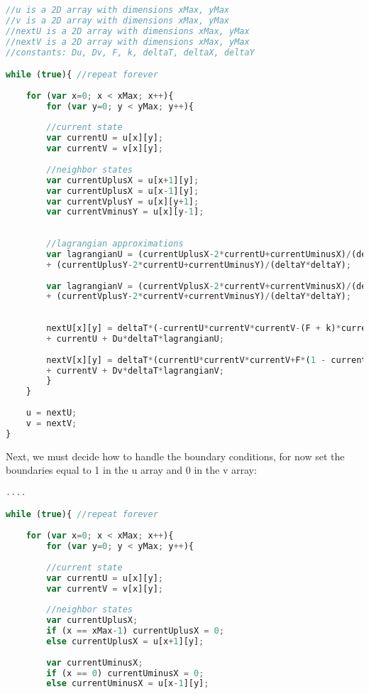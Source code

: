 {\begin{lstlisting}[language=JavaScript]
//u is a 2D array with dimensions xMax, yMax
//v is a 2D array with dimensions xMax, yMax
//nextU is a 2D array with dimensions xMax, yMax
//nextV is a 2D array with dimensions xMax, yMax
//constants: Du, Dv, F, k, deltaT, deltaX, deltaY

while (true){ //repeat forever
	
    for (var x=0; x < xMax; x++){
    	for (var y=0; y < yMax; y++){
    	
	    //current state
	    var currentU = u[x][y];
	    var currentV = v[x][y];
		
	    //neighbor states
	    var currentUplusX = u[x+1][y];
	    var currentUplusX = u[x-1][y];
	    var currentVplusY = u[x][y+1];
	    var currentVminusY = u[x][y-1];
		
		
	    //lagrangian approximations
	    var lagrangianU = (currentUplusX-2*currentU+currentUminusX)/(deltaX*deltaX) 
		+ (currentUplusY-2*currentU+currentUminusY)/(deltaY*deltaY); 
			
	    var lagrangianV = (currentVplusX-2*currentV+currentVminusX)/(deltaX*deltaX)
		+ (currentVplusY-2*currentV+currentVminusY)/(deltaY*deltaY); 
		
		
	    nextU[x][y] = deltaT*(-currentU*currentV*currentV-(F + k)*currentV) 
		+ currentU + Du*deltaT*lagrangianU;
			
	    nextV[x][y] = deltaT*(currentU*currentV*currentV+F*(1 - currentU)) 
		+ currentV + Dv*deltaT*lagrangianV;
    	}
    }
    
    u = nextU;
    v = nextV;
}
\end{lstlisting}


Next, we must decide how to handle the boundary conditions, for now set the boundaries equal to 1 in the u array and 0 in the v array:

\begin{lstlisting}[language=JavaScript]
....

while (true){ //repeat forever
	
    for (var x=0; x < xMax; x++){
    	for (var y=0; y < yMax; y++){
    	
	    //current state
	    var currentU = u[x][y];
	    var currentV = v[x][y];
		
	    //neighbor states
	    var currentUplusX;
	    if (x == xMax-1) currentUplusX = 0;
	    else currentUplusX = u[x+1][y];
	    
	    var currentUminusX;
	    if (x == 0) currentUminusX = 0;
	    else currentUminusX = u[x-1][y];
	    

\end{lstlisting}}
